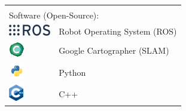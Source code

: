 \documentclass[aspectratio=169]{beamer}
\begin{document}
\begin{frame}
\begin{columns}[onlytextwidth]
\begin{column}{0.66\textwidth}
\begin{tabular}{ll}
	&\\
 	\multicolumn{2}{l}{Software (Open-Source):}\\
	\includegraphics[height=0.5cm]{./Abbildungen/ros_logo.png} & Robot Operating System (ROS) \\
	\includegraphics[height=0.7cm]{./Abbildungen/20636162.png} & Google Cartographer (SLAM)\\
	\includegraphics[height=0.7cm]{./Abbildungen/opengraph-icon-200x200.png} & Python\\
	\includegraphics[height=0.7cm]{./Abbildungen/cpp_logo.png} & C++
       \end{tabular}
    \end{column}
  \end{columns}
  \end{frame}

\begin{frame}[plain]
\end{frame}
\end{document}
